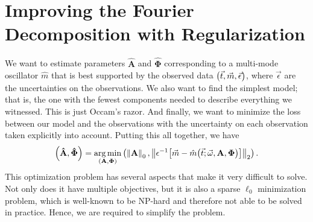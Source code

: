 \documentclass[11pt,twoside]{book}
\begin{document}
\section{Improving the Fourier Decomposition with Regularization}
We want to estimate parameters $\mathbf {\hat A}$ and $\boldsymbol{\hat \Phi}$ corresponding to a multi-mode oscillator $\hat m$ that is best supported by the observed data $\qty(\vec t, \vec m, \vec \epsilon)$, where $\vec \epsilon$ are the uncertainties on the observations. We also want to find the simplest model; that is, the one with the fewest components needed to describe everything we witnessed. This is just Occam's razor. And finally, we want to minimize the loss between our model and the observations with the uncertainty on each observation taken explicitly into account. Putting this all together, we have
\begin{equation}
    \qty(\mathbf {\hat A}, \boldsymbol{\hat \Phi}) =
      \underset{\qty(\mathbf A, \boldsymbol \Phi)}{\arg\min} 
      \left(\left\|\mathbf{A} \right\|_0,
            \left\| \epsilon^{-1}\qty[\vec m - \hat m\qty(\vec t ; {\vec \omega}, \mathbf{A}, \boldsymbol{\Phi})]\right\|_2
      \right). 
\end{equation}
This optimization problem has several aspects that make it very difficult to solve. Not only does it have multiple objectives, but it is also a sparse $\ell_0$ minimization problem, which is well-known to be NP-hard and therefore not able to be solved in practice. Hence, we are required to simplify the problem. 
\end{document}
